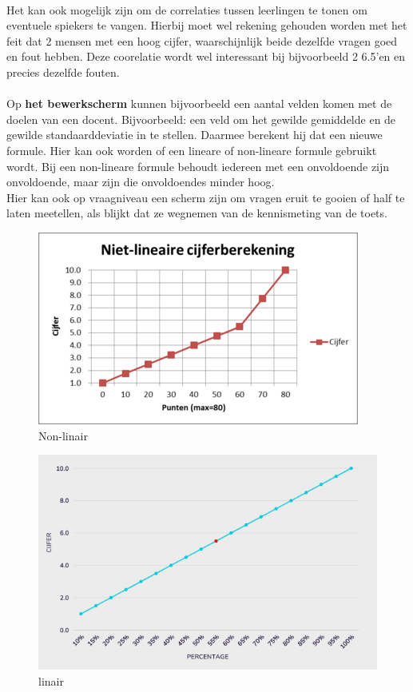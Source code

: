 \documentclass[12pt]{article}
\begin{document}
\begin{multicols}{2}
\\
Het kan ook mogelijk zijn om de correlaties tussen leerlingen te tonen om eventuele spiekers te vangen. Hierbij moet wel rekening gehouden worden met het feit dat 2 mensen met een hoog cijfer, waarschijnlijk beide dezelfde vragen goed en fout hebben. Deze coorelatie wordt wel interessant bij bijvoorbeeld 2 6.5'en en precies dezelfde fouten.\\
\\
Op \textbf{het bewerkscherm} kunnen bijvoorbeeld een aantal velden komen met de doelen van een docent. Bijvoorbeeld: een veld om het gewilde gemiddelde en de gewilde standaarddeviatie in te stellen. Daarmee berekent hij dat een nieuwe formule. Hier kan ook worden of een lineare of non-lineare formule gebruikt wordt. Bij een non-lineare formule behoudt iedereen met een onvoldoende zijn onvoldoende, maar zijn die onvoldoendes minder hoog. \\
Hier kan ook op vraagniveau een scherm zijn om vragen eruit te gooien of half te laten meetellen, als blijkt dat ze wegnemen van de kennismeting van de toets.
\begin{figure}[H]
    \centering
    \includegraphics[width=1\linewidth]{./images/methoden/analyseren/Niet-lineaire.png}
    \caption{Non-linair}
    \label{fig:non-linear}
\end{figure}
\begin{figure}[H]
    \centering
    \includegraphics[width=1\linewidth]{./images/methoden/analyseren/linair.png}
    \caption{linair}
    \label{fig:linair}
\end{figure}
\end{multicols}
\end{document}
